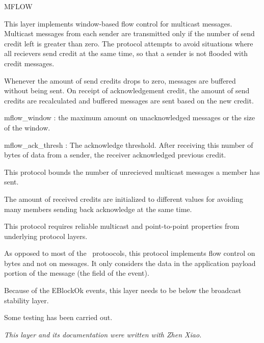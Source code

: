 \begin{Layer}{MFLOW} 

This layer implements window-based flow control for multicast messages.
Multicast messages from each sender are transmitted only if the number of send
credit left is greater than zero.  The protocol attempts to avoid situations
where all recievers send credit at the same time, so that a sender is not
flooded with credit messages.

\begin{Protocol}
Whenever the amount of send credits drops to zero, messages are buffered without
being sent.  On receipt of acknowledgement credit, the amount of send credits
are recalculated and buffered messages are sent based on the new credit.
\end{Protocol}

\begin{Parameters}
\item mflow\_window : the maximum amount on unacknowledged messages or the size of the
window.
\item mflow\_ack\_thresh : The acknowledge threshold.  After receiving this number of
bytes of data from a sender, the receiver acknowledged previous credit.
\end{Parameters}

\begin{Properties}
\item
This protocol bounds the number of unrecieved multicast messages a member has
sent.
\item
The amount of received credits are initialized to different values for
avoiding many members sending back acknowledge at the same time. 
\item
This protocol requires reliable multicast and point-to-point properties from
underlying protocol layers.
\end{Properties}

\begin{Notes}
\item
As opposed to most of the \ensemble\ protoocols, this protocol implements flow
control on bytes and not on messages.  It only considers the data in the
application payload portion of the message (the  field of the
event).
\item
Because of the EBlockOk events, this layer needs to be below the
broadcast stability layer.
\end{Notes}

\begin{Sources}
\end{Sources}

\begin{Testing}
\item
Some testing has been carried out.
\end{Testing}

\emph{This layer and its documentation were written with Zhen Xiao.}
\end{Layer}
